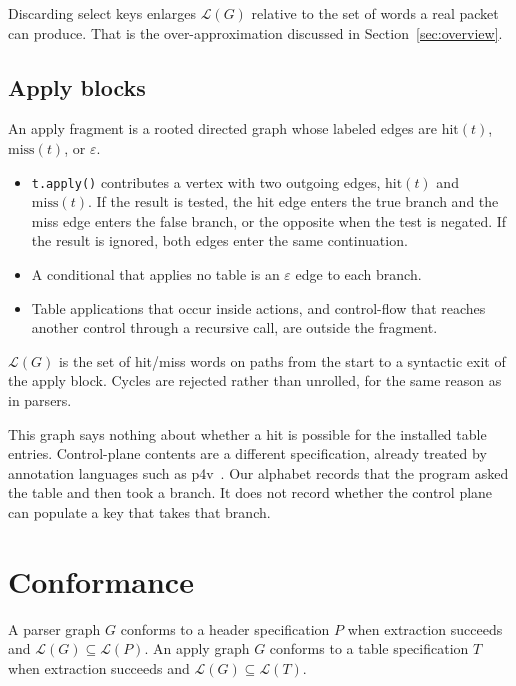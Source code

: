\documentclass[a4paper,UKenglish,cleveref,autoref]{lipics-v2021}
\begin{document}
Discarding select keys enlarges \(\mathcal{L}(G)\) relative to the set of words a real packet can produce.
That is the over-approximation discussed in Section~\ref{sec:overview}.

\subsection{Apply blocks}

An apply fragment is a rooted directed graph whose labeled edges are \(\mathrm{hit}(t)\), \(\mathrm{miss}(t)\), or \(\varepsilon\).
\begin{itemize}
\item \texttt{t.apply()} contributes a vertex with two outgoing edges, \(\mathrm{hit}(t)\) and \(\mathrm{miss}(t)\).
  If the result is tested, the hit edge enters the true branch and the miss edge enters the false branch, or the opposite when the test is negated.
  If the result is ignored, both edges enter the same continuation.
\item A conditional that applies no table is an \(\varepsilon\) edge to each branch.
\item Table applications that occur inside actions, and control-flow that reaches another control through a recursive call, are outside the fragment.
\end{itemize}
\(\mathcal{L}(G)\) is the set of hit/miss words on paths from the start to a syntactic exit of the apply block.
Cycles are rejected rather than unrolled, for the same reason as in parsers.

This graph says nothing about whether a hit is possible for the installed table entries.
Control-plane contents are a different specification, already treated by annotation languages such as p4v~\cite{p4v}.
Our alphabet records that the program asked the table and then took a branch.
It does not record whether the control plane can populate a key that takes that branch.

\section{Conformance}
\label{sec:check}

\begin{definition}
\label{def:conf}
A parser graph \(G\) conforms to a header specification \(P\) when extraction succeeds and \(\mathcal{L}(G) \subseteq \mathcal{L}(P)\).
An apply graph \(G\) conforms to a table specification \(T\) when extraction succeeds and \(\mathcal{L}(G) \subseteq \mathcal{L}(T)\).
\end{definition}
\end{document}
